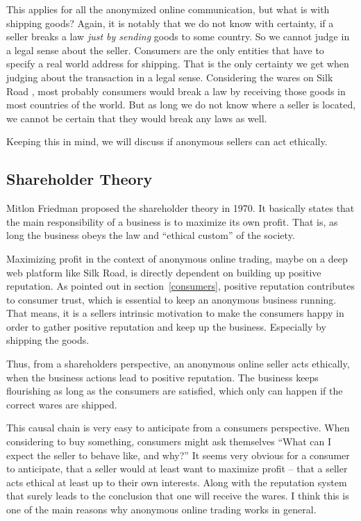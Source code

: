 This applies for all the anonymized online communication, but what is with shipping goods? Again, it is notably that we do not know with certainty, if a seller breaks a law \emph{just by sending} goods to some country. So we cannot judge in a legal sense about the seller. Consumers are the only entities that have to specify a real world address for shipping. That is the only certainty we get when judging about the transaction in a legal sense. Considering the wares on Silk Road \cite{silkroad2013}, most probably consumers would break a law by receiving those goods in most countries of the world. But as long we do not know where a seller is located, we cannot be certain that they would break any laws as well.

Keeping this in mind, we will discuss if anonymous sellers can act ethically.

\subsection{Shareholder Theory}

Mitlon Friedman proposed the shareholder theory in 1970. It basically states that the main responsibility of a business is to maximize its own profit. That is, as long the business obeys the law and ``ethical custom'' of the society\cite{shareholder}. 

Maximizing profit in the context of anonymous online trading, maybe on a deep web platform like Silk Road, is directly dependent on building up positive reputation. As pointed out in section~\ref{consumers}, positive reputation contributes to consumer trust, which is essential to keep an anonymous business running. That means, it is a sellers intrinsic motivation to make the consumers happy in order to gather positive reputation and keep up the business. Especially by shipping the goods.

Thus, from a shareholders perspective, an anonymous online seller acts ethically, when the business actions lead to positive reputation. The business keeps flourishing as long as the consumers are satisfied, which only can happen if the correct wares are shipped.

This causal chain is very easy to anticipate from a consumers perspective. When considering to buy something, consumers might ask themselves ``What can I expect the seller to behave like, and why?'' It seems very obvious for a consumer to anticipate, that a seller would at least want to maximize profit -- that a seller acts ethical at least up to their own interests. Along with the reputation system that surely leads to the conclusion that one will receive the wares. I think this is one of the main reasons why anonymous online trading works in general.

